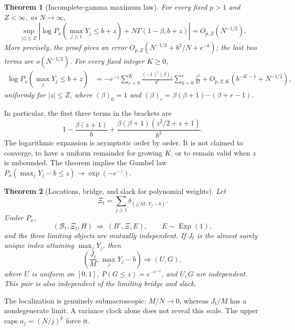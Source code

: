 \documentclass[11pt,a4paper]{article}
\numberwithin{equation}{section}
\newtheorem{theorem}{Theorem}[section]
\theoremstyle{definition}
\theoremstyle{remark}
\newcommand{\Exp}{\operatorname{Exp}}
\newcommand{\rise}[2]{(#1)_{#2}}
\begin{document}
\begin{theorem}[Incomplete-gamma maximum law]
\label{thm:gamma}
For every fixed $p>1$ and $Z<\infty$, as $N\to\infty$,
\begin{equation}
 \sup_{|z|\le Z}\left|
 \log P_x\!\left(\max_{j\ge1}Y_j\le b+z\right)
       +N\Gamma(1-\beta,b+z)\right|=O_{p,Z}(N^{-1/2}).
 \label{eq:gamma-main}
\end{equation}
More precisely, the proof gives an error
$O_{p,Z}(N^{-1/2}+b^2/N+e^{-b})$; the last two terms are
$o(N^{-1/2})$. For every fixed integer $K\ge0$,
\begin{align}
 \log P_x\!\left(\max_jY_j\le b+z\right)
 &=-e^{-z}\sum_{r=0}^K
   \frac{(-1)^r\rise{\beta}{r}}{b^r}
        \sum_{k=0}^r\frac{z^k}{k!}
   +O_{p,Z,K}(b^{-K-1}+N^{-1/2}), \label{eq:allorder}
\end{align}
uniformly for $|z|\le Z$, where $\rise\beta0=1$ and
$\rise\beta r=\beta(\beta+1)\cdots(\beta+r-1)$.
\end{theorem}
In particular, the first three terms in the brackets are
\begin{equation}
 1-\frac{\beta(z+1)}b
 +\frac{\beta(\beta+1)(z^2/2+z+1)}{b^2}.
 \label{eq:twocorrections}
\end{equation}
The logarithmic expansion is asymptotic order by order. It is not
claimed to converge, to have a uniform remainder for growing $K$, or to
remain valid when $z$ is unbounded. The theorem implies the Gumbel law
$P_x(\max_jY_j-b\le z)\to\exp(-e^{-z})$.

\begin{theorem}[Locations, bridge, and slack for polynomial weights]
\label{thm:jointpoly}
Let
\begin{equation}
 \Xi_t=\sum_{j\ge1}\delta_{(j/M,\,Y_j-b)}.
 \label{eq:polypp}
\end{equation}
Under $P_x$,
\begin{equation}
  (\mathcal B_t,\Xi_t,H)
       \ \Rightarrow\ (B^\circ,\Xi,E),\qquad E\sim\Exp(1),
 \label{eq:joint-main}
\end{equation}
and the three limiting objects are mutually independent.
If $J_t$ is the almost surely unique index attaining $\max_jY_j$, then
\begin{equation}
 \left(\frac{J_t}{M},\max_jY_j-b\right)
 \Rightarrow (U,G), \label{eq:argmax}
\end{equation}
where $U$ is uniform on $[0,1]$, $P(G\le z)=e^{-e^{-z}}$, and $U,G$
are independent. This pair is also independent of the limiting bridge
and slack.
\end{theorem}
The localization is genuinely submacroscopic: $M/N\to0$, whereas
$J_t/M$ has a nondegenerate limit. A variance clock alone does not reveal
this scale. The upper caps $a_j=(N/j)^p$ force it.
\end{document}
